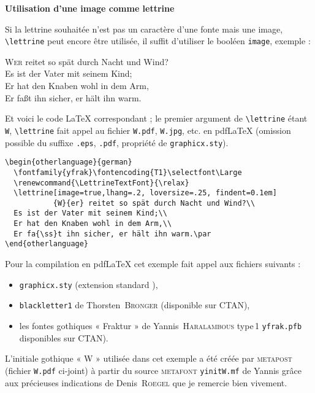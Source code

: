 \documentclass[paper=a4,12pt,german,french]{scrartcl}
\newcommand*{\MF}{{\small\scshape metafont}}
\newcommand*{\MP}{{\small\scshape metapost}}
\begin{document}
\newpage
\begin{center}
\large\bfseries Utilisation d'une image comme lettrine
\end{center}

\vspace{\baselineskip}
Si la lettrine souhaitée n'est pas un caractère d'une fonte mais une
image, \verb+\lettrine+ peut encore être utilisée, il suffit
d'utiliser le booléen \texttt{image}, exemple :

\begin{otherlanguage}{german}
\renewcommand{\LettrineTextFont}{\relax}
\selectfont\Large
\lettrine[image=true,lhang=.2, loversize=.25, findent=0.1em]
{W}{er} reitet so spät durch Nacht und Wind?\\
Es ist der Vater mit seinem Kind;\\
Er hat den Knaben wohl in dem Arm,\\
Er fa{\ss}t ihn sicher, er hält ihn warm.\par
\end{otherlanguage}

\vspace{.5\baselineskip}
Et voici le code \LaTeX{} correspondant ;
le  premier argument de \verb+\lettrine+ étant \verb+W+,
\verb+\lettrine+ fait appel au fichier \verb+W.pdf+, \verb+W.jpg+, etc. en
pdfLaTeX (omission possible du suffixe \verb+.eps+,  \verb+.pdf+, propriété
de \verb+graphicx.sty+).

\begin{verbatim}
\begin{otherlanguage}{german}
  \fontfamily{yfrak}\fontencoding{T1}\selectfont\Large
  \renewcommand{\LettrineTextFont}{\relax}
  \lettrine[image=true,lhang=.2, loversize=.25, findent=0.1em]
           {W}{er} reitet so spät durch Nacht und Wind?\\
  Es ist der Vater mit seinem Kind;\\
  Er hat den Knaben wohl in dem Arm,\\
  Er fa{\ss}t ihn sicher, er hält ihn warm.\par
\end{otherlanguage}
\end{verbatim}

Pour la compilation en pdfLaTeX cet exemple fait appel aux fichiers suivants :
\begin{itemize}
\item \texttt{graphicx.sty} (extension standard \LaTeXe{}),
\item \texttt{blackletter1} de Thorsten~\textsc{Bronger} (disponible sur CTAN),
\item les fontes gothiques « Fraktur » de Yannis~\textsc{Haralambous} type\,1
  \texttt{yfrak.pfb} disponibles sur CTAN).
\end{itemize}
L'initiale gothique « W » utilisée dans
cet exemple a été créée par \MP{} (fichier \texttt{W.pdf} ci-joint)
à partir du source \MF{} \texttt{yinitW.mf} de Yannis grâce aux précieuses
indications de Denis~\textsc{Roegel} que je remercie bien vivement.
\end{document}
